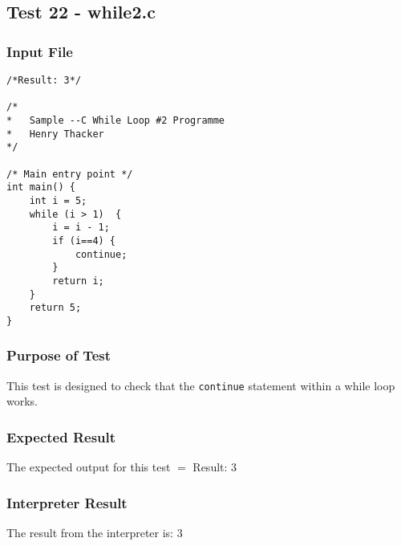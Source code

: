 \subsection{Test 22 - while2.c}
\subsubsection{Input File}
\begin{lstlisting}[showstringspaces=false,breaklines=true,backgroundcolor=\color{light-gray}, captionpos=b]
/*Result: 3*/

/*
*	Sample --C While Loop #2 Programme
*	Henry Thacker
*/

/* Main entry point */
int main() {
	int i = 5;
	while (i > 1)  {
		i = i - 1;
		if (i==4) {
			continue;
		}
		return i;
	}
	return 5;
}
\end{lstlisting}\subsubsection{Purpose of Test}
This test is designed to check that the \verb!continue! statement within a while loop works.

\subsubsection{Expected Result}
The expected output for this test $=$ Result: 3
\subsubsection{Interpreter Result}
The result from the interpreter is: 3
